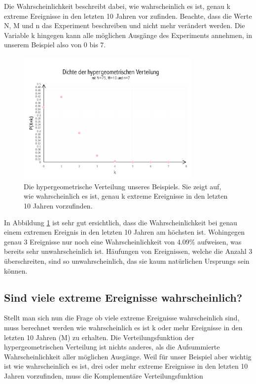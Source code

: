 \begin{refsection}
Die Wahrscheinlichkeit beschreibt dabei, wie wahrscheinlich es ist, genau k extreme Ereignisse in den letzten 10 Jahren vor zufinden.
Beachte, dass die Werte N, M und n das Experiment beschreiben und nicht mehr verändert werden. Die Variable k hingegen kann alle möglichen Ausgänge des Experiments annehmen, in unserem Beispiel also von 0 bis 7.

\begin{figure}[htbp]
\centering
\includegraphics[width=0.8\textwidth]{extrem/Hyper.pdf}
\caption{Die hypergeometrische Verteilung unseres Beispiels. Sie zeigt auf, wie wahrscheinlich es ist, genau k extreme Ereignisse in den letzten 10 Jahren vorzufinden.}
\label{Hyper}
\end{figure}

In Abbildung \ref{Hyper} ist sehr gut ersichtlich, dass die Wahrscheinlichkeit bei genau einem extremen Ereignis in den letzten 10 Jahren am höchsten ist. Wohingegen genau 3 Ereignisse nur noch eine Wahrscheinlichkeit von 4.09\% aufweisen, was bereits sehr unwahrscheinlich ist. Häufungen von Ereignissen, welche die Anzahl 3 überschreiten, sind so unwahrscheinlich, das sie kaum natürlichen Ursprungs sein können.

\subsection{Sind viele extreme Ereignisse wahrscheinlich?}
Stellt man sich nun die Frage ob viele extreme Ereignisse wahrscheinlich sind, muss berechnet werden wie wahrscheinlich es ist k oder mehr Ereignisse in den letzten 10 Jahren (M) zu erhalten. 
Die Verteilungsfunktion der hypergeometrischen Verteilung ist nichts anderes, als die Aufsummierte Wahrscheinlichkeit aller möglichen Ausgänge. Weil für unser Beispiel aber wichtig ist wie wahrscheinlich es ist, drei oder mehr extreme Ereignisse in den letzten 10 Jahren vorzufinden, muss die Komplementäre Verteilungsfunktion 


\end{refsection}
